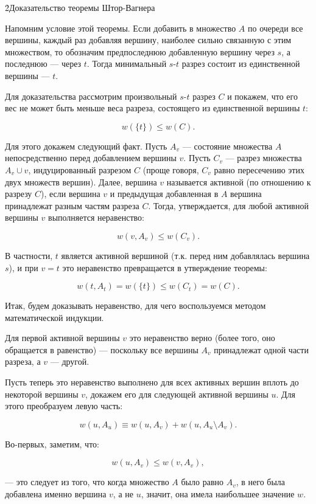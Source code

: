 \h2{Доказательство теоремы Штор-Вагнера}

Напомним условие этой теоремы. Если добавить в множество $A$ по очереди все вершины, каждый раз добавляя вершину, наиболее сильно связанную с этим множеством, то обозначим предпоследнюю добавленную вершину через $s$, а последнюю --- через $t$. Тогда минимальный $s$-$t$ разрез состоит из единственной вершины --- $t$.

Для доказательства рассмотрим произвольный $s$-$t$ разрез $C$ и покажем, что его вес не может быть меньше веса разреза, состоящего из единственной вершины $t$:

$$ w(\{t\}) \le w(C). $$

Для этого докажем следующий факт. Пусть $A_v$ --- состояние множества $A$ непосредственно перед добавлением вершины $v$. Пусть $C_v$ --- разрез множества $A_v \cup v$, индуцированный разрезом $C$ (проще говоря, $C_v$ равно пересечению этих двух множеств вершин). Далее, вершина $v$ называется активной (по отношению к разрезу $C$), если вершина $v$ и предыдущая добавленная в $A$ вершина принадлежат разным частям разреза $C$. Тогда, утверждается, для любой активной вершины $v$ выполняется неравенство:

$$ w(v,A_v) \le w(C_v). $$

В частности, $t$ является активной вершиной (т.к. перед ним добавлялась вершина $s$), и при $v = t$ это неравенство превращается в утверждение теоремы:

$$ w(t,A_t) = w(\{t\}) \le w(C_t) = w(C). $$

Итак, будем доказывать неравенство, для чего воспользуемся методом математической индукции.

Для первой активной вершины $v$ это неравенство верно (более того, оно обращается в равенство) --- поскольку все вершины $A_v$ принадлежат одной части разреза, а $v$ --- другой.

Пусть теперь это неравенство выполнено для всех активных вершин вплоть до некоторой вершины $v$, докажем его для следующей активной вершины $u$. Для этого преобразуем левую часть:

$$ w(u,A_u) \equiv w(u,A_v) + w(u,A_u \setminus A_v). $$

Во-первых, заметим, что:

$$ w(u,A_v) \le w(v,A_v), $$

--- это следует из того, что когда множество $A$ было равно $A_v$, в него была добавлена именно вершина $v$, а не $u$, значит, она имела наибольшее значение $w$.

